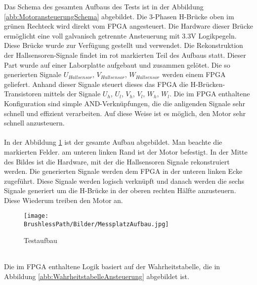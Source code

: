 Das Schema des gesamten Aufbaus des Tests ist in der Abbildung \ref{abb:MotoransteuerungSchema} abgebildet. Die 3-Phasen H-Brücke oben im grünen Rechteck wird direkt vom FPGA angesteuert. Die Hardware dieser Brücke ermöglicht eine voll galvanisch getrennte Ansteuerung mit 3.3V Logikpegeln. Diese Brücke wurde zur Verfügung gestellt und verwendet. Die Rekonstruktion der Hallsensoren-Signale findet im rot markierten Teil des Aufbaus statt. Dieser Part wurde auf einer Laborplatte aufgebaut und zusammen gelötet. Die so generierten Signale $U_{Hallsensor}$, $V_{Hallsensor}$, $W_{Hallsensor}$ werden einem FPGA geliefert. Anhand dieser Signale steuert dieses das FPGA die H-Brücken-Transistoren mittels der Signale $U_h$, $U_l$, $V_h$, $V_l$, $W_h$, $W_l$. Die im FPGA enthaltene Konfiguration sind simple AND-Verknüpfungen, die die anligenden Signale sehr schnell und effizient verarbeiten. Auf diese Weise ist es möglich, den Motor sehr schnell anzusteuern.\\
\\
In der Abbildung \ref{abb:MessplatzAufbau} ist der gesamte Aufbau abgebildet. Man beachte die markierten Felder. am unteren linken Rand ist der Motor befestigt. In der Mitte des Bildes ist die Hardware, mit der die Hallsensoren Signale rekonstruiert werden. Die generierten Signale werden dem FPGA in der unteren linken Ecke zugeführt. Diese Signale werden logisch verknüpft und danach werden die sechs Signale generiert um die H-Brücke in der oberen rechten Hälfte anzusteuern. Diese Wiederum treiben den Motor an.
\begin{figure}[h!]
	\texttt{[image: \\BrushlessPath/Bilder/MessplatzAufbau.jpg]}
	\centering
	\caption{Testaufbau} 
\label{abb:MessplatzAufbau}
\end{figure}\\
Die im FPGA enthaltene Logik basiert auf der Wahrheitstabelle, die in Abbildung \ref{abb:WahrheitstabelleAnsteuerung} abgebildet ist.
